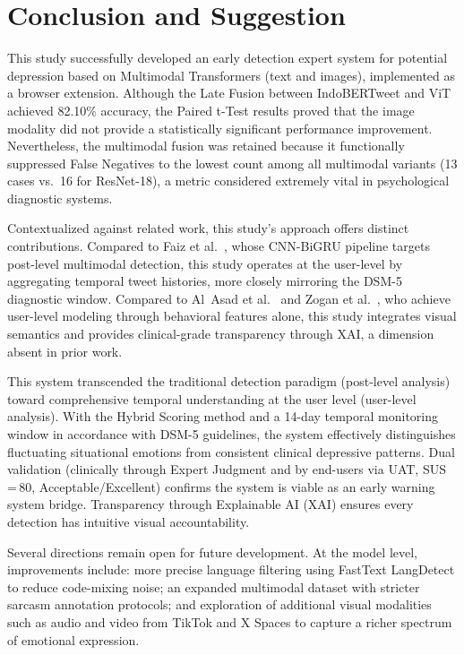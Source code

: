 \documentclass[conference]{IEEEtran}
\begin{document}
\section{Conclusion and Suggestion}

This study successfully developed an early detection expert system for
potential depression based on Multimodal Transformers (text and
images), implemented as a browser extension. Although the Late Fusion
between IndoBERTweet and ViT achieved 82.10\% accuracy, the Paired
t-Test results proved that the image modality did not provide a
statistically significant performance improvement. Nevertheless, the
multimodal fusion was retained because it functionally suppressed
False Negatives to the lowest count among all multimodal variants
(13 cases vs.\ 16 for ResNet-18), a metric considered
extremely vital in psychological diagnostic systems.

Contextualized against related work, this study's approach offers
distinct contributions. Compared to Faiz et al.\ \cite{b_faiz}, whose
CNN-BiGRU pipeline targets post-level multimodal detection, this study
operates at the user-level by aggregating temporal tweet histories,
more closely mirroring the DSM-5 diagnostic window. Compared to Al~Asad
et al.\ \cite{b_alasad} and Zogan et al.\ \cite{b_zogan}, who
achieve user-level modeling through behavioral features alone, this
study integrates visual semantics and provides clinical-grade
transparency through XAI, a dimension absent in prior work.

This system transcended the traditional detection paradigm (post-level
analysis) toward comprehensive temporal understanding at the user level
(user-level analysis). With the Hybrid Scoring method and a 14-day
temporal monitoring window in accordance with DSM-5 guidelines, the
system effectively distinguishes fluctuating situational emotions from
consistent clinical depressive patterns. Dual validation (clinically
through Expert Judgment and by end-users via UAT, SUS\,=\,80,
Acceptable/Excellent) confirms the system is viable as an early
warning system bridge. Transparency through Explainable AI (XAI)
ensures every detection has intuitive visual accountability.

Several directions remain open for future development. At the model
level, improvements include: more precise language filtering using
FastText LangDetect to reduce code-mixing noise; an expanded
multimodal dataset with stricter sarcasm annotation protocols; and
exploration of additional visual modalities such as audio and video
from TikTok and X Spaces to capture a richer spectrum of emotional
expression.
\end{document}
